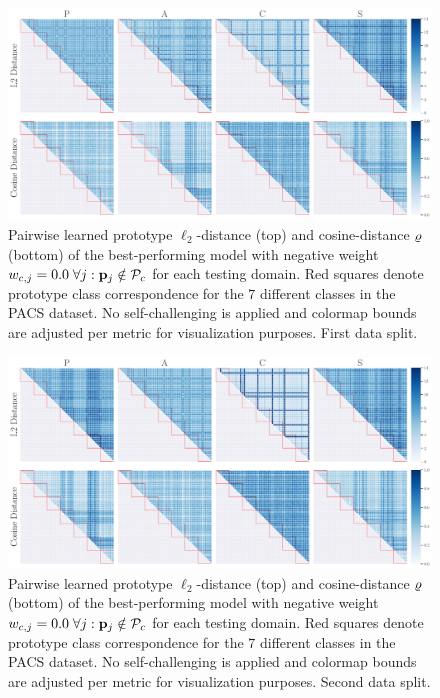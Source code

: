 
\begin{figure}[ht]
    \centering
    \includegraphics[width=\textwidth]{Figures/Chapter4/2021-01-21-ProDropIncorrectWeight0.0SAVEResNet18oracle_validation_trial0.pdf}
    \caption[First data split pairwise prototype distances with $w_{c,j} = 0.0$] {Pairwise learned prototype $\ell_2$-distance (top) and cosine-distance $\varrho$ (bottom) of the best-performing model with negative weight $w_{c,j} = 0.0\; \forall j: \mathbf{p}_{j} \notin \mathcal{P}_c$ for each testing domain. Red squares denote prototype class correspondence for the $7$ different classes in the PACS dataset. No self-challenging is applied and colormap bounds are adjusted per metric for visualization purposes. First data split.}
    \label{fig:pw_distance_0.0_trial0}
\end{figure}

\begin{figure}[ht]
    \centering
    \includegraphics[width=\textwidth]{Figures/Chapter4/2021-01-21-ProDropIncorrectWeight0.0SAVEResNet18oracle_validation_trial1.pdf}
    \caption[Second data split pairwise prototype distances with $w_{c,j} = 0.0$] {Pairwise learned prototype $\ell_2$-distance (top) and cosine-distance $\varrho$ (bottom) of the best-performing model with negative weight $w_{c,j} = 0.0\; \forall j: \mathbf{p}_{j} \notin \mathcal{P}_c$ for each testing domain. Red squares denote prototype class correspondence for the $7$ different classes in the PACS dataset. No self-challenging is applied and colormap bounds are adjusted per metric for visualization purposes. Second data split.}
    \label{fig:pw_distance_0.0_trial1}
\end{figure}

